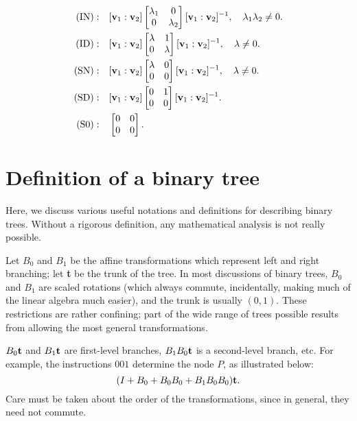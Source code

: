 \documentclass{article}
\begin{document}
\setcounter{equation}{0}
\begin{align}
{\rm (IN):\quad}&[{\bf v}_1:{\bf v}_2]\left[\begin{matrix}\lambda_1&0\\0&\lambda_2\end{matrix}\right][{\bf v}_1:{\bf v}_2]^{-1},\quad\lambda_1\lambda_2\ne0.\\
{\rm (ID):\quad}&[{\bf v}_1:{\bf v}_2]\left[\begin{matrix}\lambda&1\\0&\lambda\end{matrix}\right][{\bf v}_1:{\bf v}_2]^{-1},\quad\lambda\ne0.\\
{\rm (SN):\quad}&[{\bf v}_1:{\bf v}_2]\left[\begin{matrix}\lambda&0\\0&0\end{matrix}\right][{\bf v}_1:{\bf v}_2]^{-1},\quad\lambda\ne0.\\
{\rm (SD):\quad}&[{\bf v}_1:{\bf v}_2]\left[\begin{matrix}0&1\\0&0\end{matrix}\right][{\bf v}_1:{\bf v}_2]^{-1}.\label{SD}\\
{\rm (S0):\quad}& \left[\begin{matrix}0&0\\0&0\end{matrix}\right].
\end{align}



\section{Definition of a binary tree}

Here, we discuss various useful notations and definitions for describing binary trees.  Without a rigorous definition, any mathematical analysis is not really possible.

Let $B_0$ and $B_1$ be the affine transformations which represent left and right branching; let {\bf t} be the trunk of the tree. In most discussions of binary trees, $B_0$ and $B_1$ are scaled rotations (which always commute, incidentally, making much of the linear algebra much easier), and the trunk is usually $(0,1).$ These restrictions are rather confining; part of the wide range of trees possible results from allowing the most general transformations.

$B_0{\bf t}$ and $B_1{\bf t}$ are first-level branches, $B_1B_0{\bf t}$ is a second-level branch, etc.  For example, the instructions $001$ determine the node $P$, as illustrated below:
\begin{equation}
(I+B_0+B_0B_0+B_1B_0B_0){\bf t}.\label{treedef}
\end{equation}
Care must be taken about the order of the transformations, since in general, they need not commute.
\end{document}
